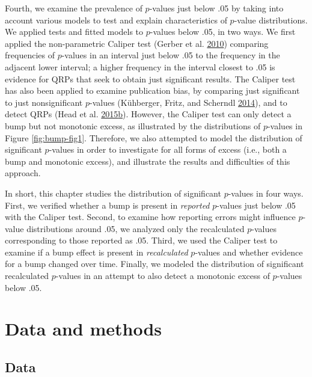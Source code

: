 \documentclass[a5paper]{book}
\begin{document}
Fourth, we examine the prevalence of \(p\)-values just below .05 by
taking into account various models to test and explain characteristics
of \(p\)-value distributions. We applied tests and fitted models to
\(p\)-values below .05, in two ways. We first applied the non-parametric
Caliper test (Gerber et al.
\protect\hyperlink{ref-doi:10.1177ux2f1532673x09350979}{2010}) comparing
frequencies of \(p\)-values in an interval just below .05 to the
frequency in the adjacent lower interval; a higher frequency in the
interval closest to .05 is evidence for QRPs that seek to obtain just
significant results. The Caliper test has also been applied to examine
publication bias, by comparing just significant to just nonsignificant
\(p\)-values (Kühberger, Fritz, and Scherndl
\protect\hyperlink{ref-doi:10.1371ux2fjournal.pone.0105825}{2014}), and
to detect QRPs (Head et al.
\protect\hyperlink{ref-doi:10.1371ux2fjournal.pbio.1002106}{2015}\protect\hyperlink{ref-doi:10.1371ux2fjournal.pbio.1002106}{b}).
However, the Caliper test can only detect a bump but not monotonic
excess, as illustrated by the distributions of \(p\)-values in Figure
\ref{fig:bump-fig1}. Therefore, we also attempted to model the
distribution of significant \(p\)-values in order to investigate for all
forms of excess (i.e., both a bump and monotonic excess), and illustrate
the results and difficulties of this approach.

In short, this chapter studies the distribution of significant
\(p\)-values in four ways. First, we verified whether a bump is present
in \emph{reported} \(p\)-values just below .05 with the Caliper test.
Second, to examine how reporting errors might influence \(p\)-value
distributions around .05, we analyzed only the recalculated \(p\)-values
corresponding to those reported as .05. Third, we used the Caliper test
to examine if a bump effect is present in \emph{recalculated}
\(p\)-values and whether evidence for a bump changed over time. Finally,
we modeled the distribution of significant recalculated \(p\)-values in
an attempt to also detect a monotonic excess of \(p\)-values below .05.

\section{Data and methods}\label{data-and-methods-1}

\subsection{Data}\label{data}
\end{document}
